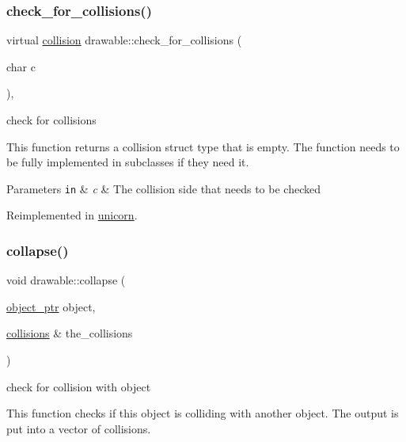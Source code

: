\subsubsection{\texorpdfstring{check\+\_\+for\+\_\+collisions()}{check\_for\_collisions()}}
{\footnotesize\ttfamily virtual \hyperlink{structcollision}{collision} drawable\+::check\+\_\+for\+\_\+collisions (\begin{DoxyParamCaption}\item[{char}]{c }\end{DoxyParamCaption})\hspace{0.3cm}{\ttfamily [inline]}, {\ttfamily [virtual]}}



check for collisions 

This function returns a collision struct type that is empty. The function needs to be fully implemented in subclasses if they need it.


\begin{DoxyParams}[1]{Parameters}
\mbox{\tt in}  & {\em c} & The collision side that needs to be checked \\
\hline
\end{DoxyParams}


Reimplemented in \hyperlink{classunicorn_a40fe782f273abf46f6121db9aa4bf77a}{unicorn}.

\mbox{\label{classdrawable_af0ddd3660d258629598dc76b31d1cc49}} 
\subsubsection{\texorpdfstring{collapse()}{collapse()}}
{\footnotesize\ttfamily void drawable\+::collapse (\begin{DoxyParamCaption}\item[{\hyperlink{typedefs_8hpp_aab5add95f06d2ba25dbfed8eb07274fa}{object\+\_\+ptr}}]{object,  }\item[{\hyperlink{typedefs_8hpp_a7e1a7f34f6d09dabb4cdafd6e4118603}{collisions} \&}]{the\+\_\+collisions }\end{DoxyParamCaption})\hspace{0.3cm}{\ttfamily [virtual]}}



check for collision with object 

This function checks if this object is colliding with another object. The output is put into a vector of collisions.


